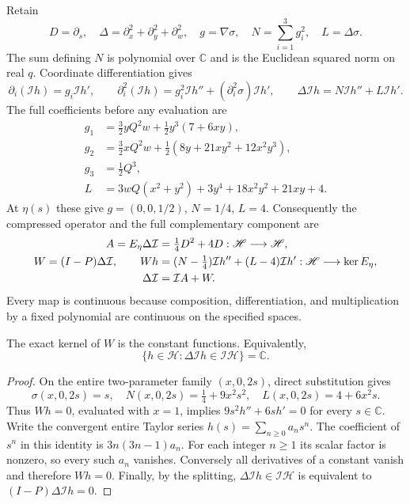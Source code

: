 Retain
\[
 D=\partial_s,\quad
 \Delta=\partial_x^2+\partial_y^2+\partial_w^2,\quad
 g=\nabla\sigma,\quad N=\sum_{i=1}^3g_i^2,\quad L=\Delta\sigma.
\]
The sum defining $N$ is polynomial over $\mathbb C$ and is the Euclidean
squared norm on real $q$. Coordinate differentiation gives
\[
 \partial_i(\mathcal I h)=g_i\mathcal I h',\qquad
 \partial_i^2(\mathcal I h)=g_i^2\mathcal I h''+(\partial_i^2\sigma)\mathcal I h',
 \qquad \Delta \mathcal I h=N\mathcal I h''+L\mathcal I h'.
\]
The full coefficients before any evaluation are
\begin{align*}
 g_1&=\tfrac32yQ^2w+\tfrac12y^3(7+6xy),\\
 g_2&=\tfrac32xQ^2w+\tfrac12(8y+21xy^2+12x^2y^3),\\
 g_3&=\tfrac12Q^3,\\
 L&=3wQ(x^2+y^2)+3y^4+18x^2y^2+21xy+4 .
\end{align*}
At $\eta(s)$ these give $g=(0,0,1/2)$, $N=1/4$, $L=4$.
Consequently the compressed operator and the full complementary
component are
\begin{align}
 A=E_\eta\Delta \mathcal I &=\tfrac14D^2+4D:
                  \mathscr H\longrightarrow\mathscr H,
                  \label{eq:cq-spatial-compression}\\
 W=(I-P)\Delta \mathcal I ,\qquad
 Wh&=(N-\tfrac14)\mathcal I h''+(L-4)\mathcal I h':
                  \mathscr H\longrightarrow\ker E_\eta ,
                  \label{eq:cq-spatial-leakage}\\
 \Delta \mathcal I &=\mathcal I A+W. \notag
\end{align}
Every map is continuous because composition, differentiation, and
multiplication by a fixed polynomial are continuous on the specified
spaces.

\begin{cqproposition}
The exact kernel of $W$ is the constant functions. Equivalently,
\[
 \{h\in\mathscr H:\Delta \mathcal I h\in \mathcal I \mathscr H\}=\mathbb C.
\]
\end{cqproposition}
\begin{proof}
On the entire two-parameter family $(x,0,2s)$, direct substitution gives
\[
 \sigma(x,0,2s)=s,\quad
 N(x,0,2s)=\tfrac14+9x^2s^2,\quad
 L(x,0,2s)=4+6x^2s .
\]
Thus $Wh=0$, evaluated with $x=1$, implies
$9s^2h''+6sh'=0$ for every $s\in\mathbb C$.
Write the convergent entire Taylor series $h(s)=\sum_{n\ge0}a_ns^n$.
The coefficient of $s^n$ in this identity is $3n(3n-1)a_n$.
For each integer $n\ge1$ its scalar factor is nonzero, so every such
$a_n$ vanishes. Conversely all derivatives of a constant vanish and
therefore $Wh=0$. Finally, by the splitting,
$\Delta \mathcal I h\in \mathcal I \mathscr H$ is equivalent to $(I-P)\Delta \mathcal I h=0$.
\end{proof}

